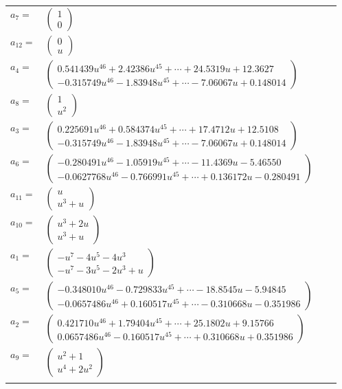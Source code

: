 \documentclass[1p]{elsarticle_modified}
\theoremstyle{definition}
\begin{document}
\begin{tabular}{m{7pt} m{180pt} m{7pt} m{180pt} }
\flushright $a_{7}=$&$\begin{pmatrix}1\\0\end{pmatrix}$ \\
\flushright $a_{12}=$&$\begin{pmatrix}0\\u\end{pmatrix}$ \\
\flushright $a_{4}=$&$\begin{pmatrix}0.541439 u^{46}+2.42386 u^{45}+\cdots+24.5319 u+12.3627\\-0.315749 u^{46}-1.83948 u^{45}+\cdots-7.06067 u+0.148014\end{pmatrix}$ \\
\flushright $a_{8}=$&$\begin{pmatrix}1\\u^2\end{pmatrix}$ \\
\flushright $a_{3}=$&$\begin{pmatrix}0.225691 u^{46}+0.584374 u^{45}+\cdots+17.4712 u+12.5108\\-0.315749 u^{46}-1.83948 u^{45}+\cdots-7.06067 u+0.148014\end{pmatrix}$ \\
\flushright $a_{6}=$&$\begin{pmatrix}-0.280491 u^{46}-1.05919 u^{45}+\cdots-11.4369 u-5.46550\\-0.0627768 u^{46}-0.766991 u^{45}+\cdots+0.136172 u-0.280491\end{pmatrix}$ \\
\flushright $a_{11}=$&$\begin{pmatrix}u\\u^3+u\end{pmatrix}$ \\
\flushright $a_{10}=$&$\begin{pmatrix}u^3+2 u\\u^3+u\end{pmatrix}$ \\
\flushright $a_{1}=$&$\begin{pmatrix}- u^7-4 u^5-4 u^3\\- u^7-3 u^5-2 u^3+u\end{pmatrix}$ \\
\flushright $a_{5}=$&$\begin{pmatrix}-0.348010 u^{46}-0.729833 u^{45}+\cdots-18.8545 u-5.94845\\-0.0657486 u^{46}+0.160517 u^{45}+\cdots-0.310668 u-0.351986\end{pmatrix}$ \\
\flushright $a_{2}=$&$\begin{pmatrix}0.421710 u^{46}+1.79404 u^{45}+\cdots+25.1802 u+9.15766\\0.0657486 u^{46}-0.160517 u^{45}+\cdots+0.310668 u+0.351986\end{pmatrix}$ \\
\flushright $a_{9}=$&$\begin{pmatrix}u^2+1\\u^4+2 u^2\end{pmatrix}$\\&\end{tabular}
\end{document}
